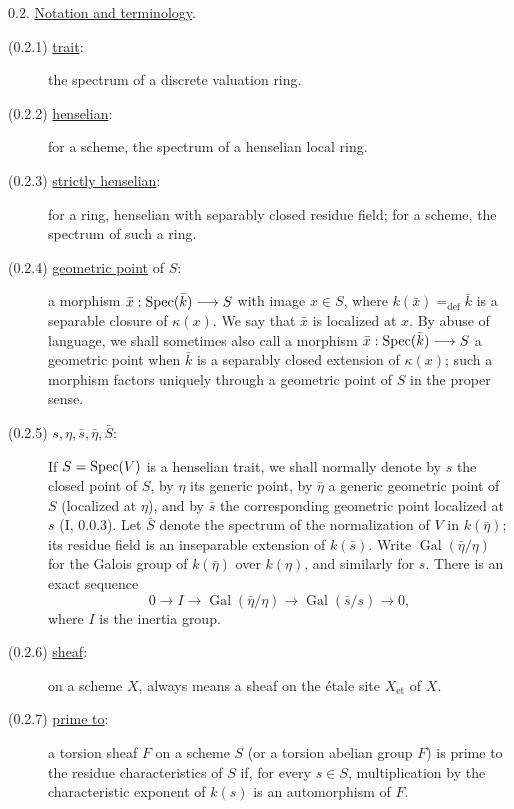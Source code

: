 
0.2. \underline{Notation and terminology}.

\begin{description}
\item[(0.2.1) \underline{trait}:]
the spectrum of a discrete valuation ring.

\item[(0.2.2) \underline{henselian}:]
for a scheme, the spectrum of a henselian local ring.

\item[(0.2.3) \underline{strictly henselian}:]
for a ring, henselian with separably closed residue field; for a scheme,
the spectrum of such a ring.

\item[(0.2.4) \underline{geometric point} of $S$:]
a morphism $\bar x:\operatorname{Spec}(\bar k)\longrightarrow S$ with image $x\in S$,
where $k(\bar x)=_{\mathrm{def}}\bar k$ is a separable closure of
$\kappa(x)$.  We say that $\bar x$ is localized at $x$.  By abuse of
language, we shall sometimes also call a morphism
$\bar x:\operatorname{Spec}(\bar k)\longrightarrow S$ a geometric point when $\bar k$
is a separably closed extension of $\kappa(x)$; such a morphism factors
uniquely through a geometric point of $S$ in the proper sense.

\item[(0.2.5) $s,\eta,\bar s,\bar\eta,\bar S$:]
If $S=\operatorname{Spec}(V)$ is a henselian trait, we shall normally denote by $s$
the closed point of $S$, by $\eta$ its generic point, by $\bar\eta$ a
generic geometric point of $S$ (localized at $\eta$), and by $\bar s$
the corresponding geometric point localized at $s$ (I, 0.0.3).  Let
$\bar S$ denote the spectrum of the normalization of $V$ in
$k(\bar\eta)$; its residue field is an inseparable extension of
$k(\bar s)$.  Write $\operatorname{Gal}(\bar\eta/\eta)$ for the Galois
group of $k(\bar\eta)$ over $k(\eta)$, and similarly for $s$.  There is
an exact sequence
\begin{equation*}
0\longrightarrow I\longrightarrow
\operatorname{Gal}(\bar\eta/\eta)\longrightarrow
\operatorname{Gal}(\bar s/s)\longrightarrow0,
\end{equation*}
where $I$ is the inertia group.

\item[(0.2.6) \underline{sheaf}:]
on a scheme $X$, always means a sheaf on the \'{e}tale site
$X_{\mathrm{et}}$ of $X$.

\item[(0.2.7) \underline{prime to}:]
a torsion sheaf $F$ on a scheme $S$ (or a torsion abelian group $F$) is
prime to the residue characteristics of $S$ if, for every $s\in S$,
multiplication by the characteristic exponent of $k(s)$ is an
automorphism of $F$.
\end{description}
